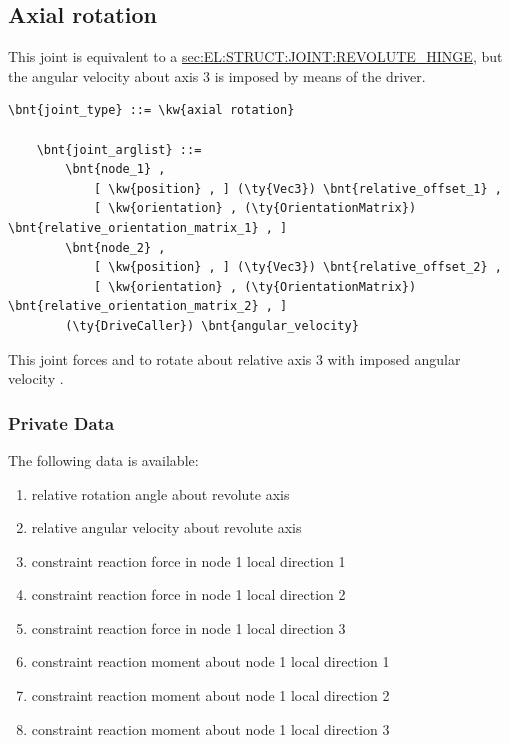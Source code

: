 \subsection{Axial rotation}
\label{sec:EL:STRUCT:JOINT:AXIAL_ROTATION}
This joint is equivalent to a
\hyperref{\kw{revolute hinge}}{\kw{revolute hinge} (see Section~}{)}{sec:EL:STRUCT:JOINT:REVOLUTE_HINGE},
but the angular velocity about axis 3 is imposed by means of the driver.
\begin{Verbatim}[commandchars=\\\{\}]
    \bnt{joint_type} ::= \kw{axial rotation}

    \bnt{joint_arglist} ::= 
        \bnt{node_1} ,
            [ \kw{position} , ] (\ty{Vec3}) \bnt{relative_offset_1} ,
            [ \kw{orientation} , (\ty{OrientationMatrix}) \bnt{relative_orientation_matrix_1} , ]
        \bnt{node_2} ,
            [ \kw{position} , ] (\ty{Vec3}) \bnt{relative_offset_2} ,
            [ \kw{orientation} , (\ty{OrientationMatrix}) \bnt{relative_orientation_matrix_2} , ]
        (\ty{DriveCaller}) \bnt{angular_velocity}
\end{Verbatim}
This joint forces  and  to rotate about relative 
axis 3 with imposed angular velocity .

\subsubsection{Private Data}
The following data is available:
\begin{enumerate}
\item {} relative rotation angle about revolute axis
\item {} relative angular velocity about revolute axis
\item {} constraint reaction force in node 1 local direction 1
\item {} constraint reaction force in node 1 local direction 2
\item {} constraint reaction force in node 1 local direction 3
\item {} constraint reaction moment about node 1 local direction 1
\item {} constraint reaction moment about node 1 local direction 2
\item {} constraint reaction moment about node 1 local direction 3
\end{enumerate}

